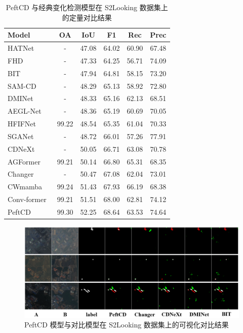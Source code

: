 \begin{table}[!htbp]
\centering
\caption{PeftCD 与经典变化检测模型在 S2Looking 数据集上的定量对比结果}
\label{tab:peftcd_s2looking}
\begin{tabular}{l c c c c c}
\toprule
\textbf{Model} & \textbf{OA} & \textbf{IoU} & \textbf{F1} & \textbf{Rec} & \textbf{Prec} \\
\midrule
HATNet~\cite{Xu2024HybridAT} & - & 47.08 & 64.02 & 60.90 & 67.48 \\
FHD~\cite{pei_feature_2022} & - & 47.33 & 64.25 & 56.71 & 74.09 \\
BIT~\cite{chen_remote_2022} & - & 47.94 & 64.81 & 58.15 & 73.20 \\
SAM-CD~\cite{ding2024adapting} & - & 48.29 & 65.13 & 58.92 & 72.80 \\
DMINet~\cite{feng_change_2023} & - & 48.33 & 65.16 & 62.13 & 68.51 \\
AEGL-Net~\cite{Ying2025AEGLNetAM} & - & 48.36 & 65.19 & 60.69 & 70.05 \\
HFIFNet~\cite{Han2025HFIFNetHF} & 99.22 & 48.54 & 65.35 & 61.04 & 70.33 \\
SGANet~\cite{j_chen_sganet_2025} & - & 48.72 & 66.01 & 57.26 & 77.91 \\
CDNeXt~\cite{wei_robust_2024} & - & 50.05 & 66.71 & 63.08 & 70.78 \\
AGFormer~\cite{Chen2025AGFormerAA} & 99.21 & 50.14 & 66.80 & 65.31 & 68.35 \\
Changer~\cite{Fang2022ChangerFI} & - & 50.47 & 67.08 & 62.04 & 73.01 \\
CWmamba ~\cite{Liu2025CWmambaLC} & 99.24 & 51.43 & 67.93 & 66.19 & 68.38 \\
Conv-former~\cite{Yang2025ConvFormerCDHC} & 99.21 & 51.51 & 68.00 & 62.81 & 74.12 \\
PeftCD & 99.30 & 52.25 & 68.64 & 63.53 & 74.64 \\
\bottomrule
\end{tabular}
\end{table}


\begin{figure}[!htbp]
  \centering
  \includegraphics[width=\textwidth]{paper_figures/基于AI基础模型微调的变化检测模型研究/PeftCD/peftcd_s2looking.png}
  \caption{PeftCD 模型与对比模型在 S2Looking 数据集上的可视化对比结果}
  \label{fig:peftcd_s2looking}
\end{figure}




